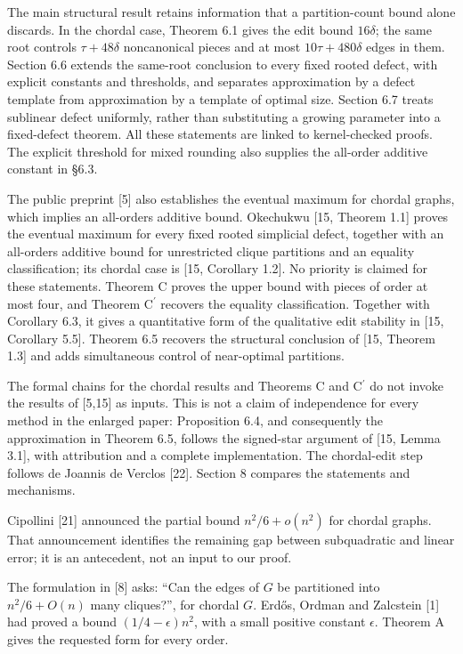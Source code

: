 \documentclass[english,11pt,a4paper]{article}
\begin{document}
The main structural result retains information that a partition-count bound alone discards. In the chordal case, Theorem 6.1 gives the edit bound \(16\delta\); the same root controls \(\tau+48\delta\) noncanonical pieces and at most \(10\tau+480\delta\) edges in them. Section 6.6 extends the same-root conclusion to every fixed rooted defect, with explicit constants and thresholds, and separates approximation by a defect template from approximation by a template of optimal size. Section 6.7 treats sublinear defect uniformly, rather than substituting a growing parameter into a fixed-defect theorem. All these statements are linked to kernel-checked proofs. The explicit threshold for mixed rounding also supplies the all-order additive constant in §6.3.

The public preprint {[}5{]} also establishes the eventual maximum for chordal graphs, which implies an all-orders additive bound. Okechukwu {[}15, Theorem 1.1{]} proves the eventual maximum for every fixed rooted simplicial defect, together with an all-orders additive bound for unrestricted clique partitions and an equality classification; its chordal case is {[}15, Corollary 1.2{]}. No priority is claimed for these statements. Theorem C proves the upper bound with pieces of order at most four, and Theorem \texorpdfstring{C\ensuremath{^{\prime}}}{C'} recovers the equality classification. Together with Corollary 6.3, it gives a quantitative form of the qualitative edit stability in {[}15, Corollary 5.5{]}. Theorem 6.5 recovers the structural conclusion of {[}15, Theorem 1.3{]} and adds simultaneous control of near-optimal partitions.

The formal chains for the chordal results and Theorems C and \texorpdfstring{C\ensuremath{^{\prime}}}{C'} do not invoke the results of {[}5,15{]} as inputs. This is not a claim of independence for every method in the enlarged paper: Proposition 6.4, and consequently the approximation in Theorem 6.5, follows the signed-star argument of {[}15, Lemma 3.1{]}, with attribution and a complete implementation. The chordal-edit step follows de Joannis de Verclos {[}22{]}. Section 8 compares the statements and mechanisms.

Cipollini {[}21{]} announced the partial bound \(n^2/6+o(n^2)\) for chordal graphs. That announcement identifies the remaining gap between subquadratic and linear error; it is an antecedent, not an input to our proof.

The formulation in {[}8{]} asks: ``Can the edges of \(G\) be partitioned into \(n^2/6+O(n)\) many cliques?'', for chordal \(G\). Erdős, Ordman and Zalcstein {[}1{]} had proved a bound \((1/4-\epsilon)n^2\), with a small positive constant \(\epsilon\). Theorem A gives the requested form for every order.
\end{document}
